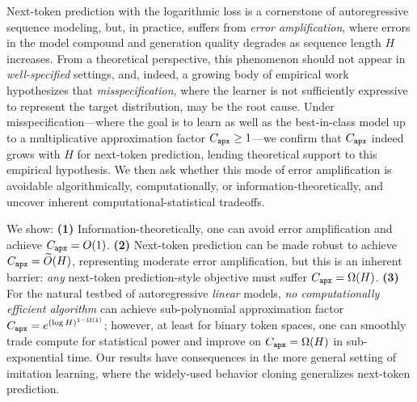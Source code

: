 
  Next-token prediction with the logarithmic loss is a cornerstone of autoregressive sequence modeling, but, in practice, suffers from \emph{error amplification}, where errors in the model compound and generation quality degrades as sequence length $H$ increases. From a theoretical perspective, this phenomenon should not appear in \emph{well-specified} settings, and, indeed, a growing body of empirical work hypothesizes that \emph{misspecification}, where the learner is not sufficiently expressive to represent the target distribution, may be the root cause. Under misspecification---where the goal is to learn as well as the best-in-class model up to a multiplicative approximation factor $C_{\texttt{apx}}\geq{}1$---we confirm that $C_{\texttt{apx}}$ indeed grows with $H$ for next-token prediction, lending theoretical support to this empirical hypothesis.
  We then ask whether this mode of error amplification is avoidable algorithmically, computationally, or information-theoretically, and uncover inherent computational-statistical tradeoffs.
  
We show: \textbf{(1)} Information-theoretically, one can avoid error amplification and achieve $C_{\texttt{apx}}=O(1)$. \textbf{(2)} Next-token prediction can be made robust to achieve $C_{\texttt{apx}}=\widetilde{O}(H)$, representing moderate error amplification, but this is an inherent barrier: \emph{any} next-token prediction-style objective must suffer $C_{\texttt{apx}}=\Omega(H)$. \textbf{(3)} For the natural testbed of autoregressive \emph{linear} models, \emph{no computationally efficient algorithm} can achieve sub-polynomial approximation factor $C_{\texttt{apx}}=e^{(\log H)^{1-\Omega(1)}}$; however, at least for binary token spaces, one can smoothly trade compute for statistical power and improve on $C_{\texttt{apx}}=\Omega(H)$ in sub-exponential time.
  Our results have consequences in the more general setting of imitation learning, where the widely-used behavior cloning generalizes next-token prediction.\loose






  









